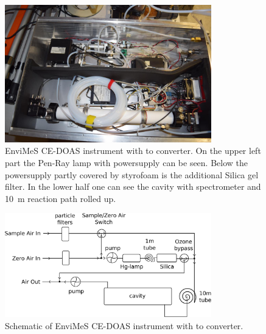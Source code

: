 \begin{figure}[htbp]
  \centering
  \includegraphics[width=0.8\textwidth]{images/envimes_up.jpg}
  \caption{EnviMeS CE-DOAS instrument with  to 
    converter. On the upper left part the Pen-Ray lamp with
    powersupply can be seen. Below the powersupply partly covered by
    styrofoam is the additional Silica gel filter. In the lower half
    one can see the cavity with spectrometer and \SI{10}{\meter}
    reaction path rolled up.}
  \label{fig:envimes}
\end{figure}

\begin{figure}[htbp]
  \centering
  \includegraphics[width=0.8\textwidth]{images/envimes_setup.eps}
  \caption{Schematic of EnviMeS CE-DOAS instrument with  to
     converter.}
  \label{fig:envimes-schematic}
\end{figure}

